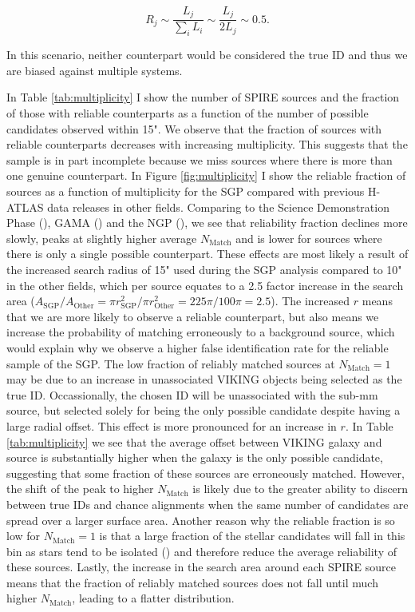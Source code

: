 \begin{equation}
    R_j \sim \frac{L_j}{\sum_i L_i} \sim \frac{L_j}{2L_j} \sim 0.5.
\end{equation}

In this scenario, neither counterpart would be considered the true ID and thus we are biased against multiple systems. 

In Table \ref{tab:multiplicity} I show the number of SPIRE sources and the fraction of those with reliable counterparts as a function of the number of possible candidates observed within 15". We observe that the fraction of sources with reliable counterparts decreases with increasing multiplicity. This suggests that the sample is in part incomplete because we miss sources where there is more than one genuine counterpart. In Figure \ref{fig:multiplicity} I show the reliable fraction of sources as a function of multiplicity for the SGP compared with previous H-ATLAS data releases in other fields. Comparing to the Science Demonstration Phase (\citealt{Fleuren_2012}), GAMA (\citealt{Bourne_2016}) and the NGP (\citealt{Furlanetto_2018}), we see that reliability fraction declines more slowly, peaks at slightly higher average $N_{\textrm{Match}}$ and is lower for sources where there is only a single possible counterpart. These effects are most likely a result of the increased search radius of 15" used during the SGP analysis compared to 10" in the other fields, which per source equates to a 2.5 factor increase in the search area ($A_{\textrm{SGP}}/A_{\textrm{Other}} = \pi r_{\textrm{SGP}}^2/\pi r_{\textrm{Other}}^2 = 225\pi/100\pi = 2.5$). The increased $r$ means that we are more likely to observe a reliable counterpart, but also means we increase the probability of matching erroneously to a background source, which would explain why we observe a higher false identification rate for the reliable sample of the SGP. The low fraction of reliably matched sources at $N_{\textrm{Match}} = 1$ may be due to an increase in unassociated VIKING objects being selected as the true ID. Occassionally, the chosen ID will be unassociated with the sub-mm source, but selected solely for being the only possible candidate despite having a large radial offset. This effect is more pronounced for an increase in $r$. In Table \ref{tab:multiplicity} we see that the average offset between VIKING galaxy and source is substantially higher when the galaxy is the only possible candidate, suggesting that some fraction of these sources are erroneously matched. However, the shift of the peak to higher $N_{\textrm{Match}}$ is likely due to the greater ability to discern between true IDs and chance alignments when the same number of candidates are spread over a larger surface area. Another reason why the reliable fraction is so low for $N_{\textrm{Match}} = 1$ is that a large fraction of the stellar candidates will fall in this bin as stars tend to be isolated (\citealt{Bourne_2016}) and therefore reduce the average reliability of these sources. Lastly, the increase in the search area around each SPIRE source means that the fraction of reliably matched sources does not fall until much higher $N_{\textrm{Match}}$, leading to a flatter distribution.


